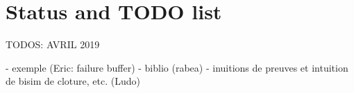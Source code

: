 \documentclass{lmcs}
\newcommand{\TODO}[1]{\textcolor{red}{\textbf{[TODO:#1]}}}
\begin{document}
\section*{Status and TODO list}

TODOS: AVRIL 2019

- exemple (Eric: failure buffer)
- biblio (rabea)
- inuitions de preuves et intuition de bisim de cloture, etc. (Ludo)























\end{document}
